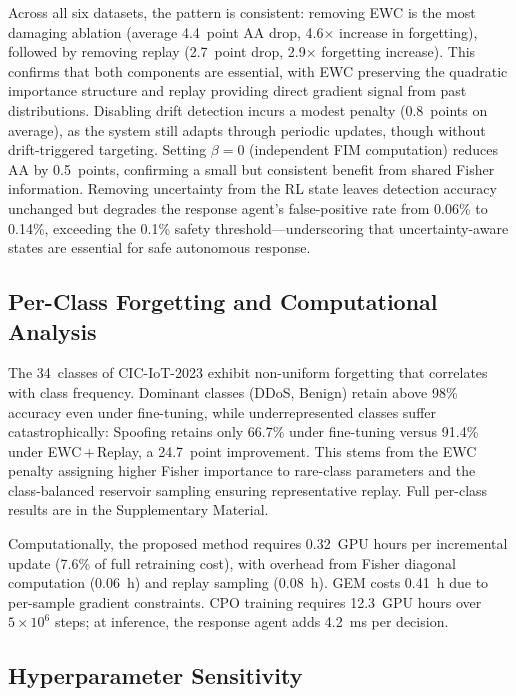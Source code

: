 \documentclass[journal]{IEEEtran}
\theoremstyle{definition}
\theoremstyle{remark}
\begin{document}
Across all six datasets, the pattern is consistent: removing EWC is the most damaging ablation (average 4.4~point AA drop, 4.6$\times$ increase in forgetting), followed by removing replay (2.7~point drop, 2.9$\times$ forgetting increase). This confirms that both components are essential, with EWC preserving the quadratic importance structure and replay providing direct gradient signal from past distributions. Disabling drift detection incurs a modest penalty (0.8~points on average), as the system still adapts through periodic updates, though without drift-triggered targeting. Setting $\beta = 0$ (independent FIM computation) reduces AA by 0.5~points, confirming a small but consistent benefit from shared Fisher information. Removing uncertainty from the RL state leaves detection accuracy unchanged but degrades the response agent's false-positive rate from 0.06\% to 0.14\%, exceeding the 0.1\% safety threshold---underscoring that uncertainty-aware states are essential for safe autonomous response.

\subsection{Per-Class Forgetting and Computational Analysis}
\label{subsec:perclass}

The 34~classes of CIC-IoT-2023 exhibit non-uniform forgetting that correlates with class frequency. Dominant classes (DDoS, Benign) retain above 98\% accuracy even under fine-tuning, while underrepresented classes suffer catastrophically: Spoofing retains only 66.7\% under fine-tuning versus 91.4\% under EWC\,+\,Replay, a 24.7~point improvement. This stems from the EWC penalty assigning higher Fisher importance to rare-class parameters and the class-balanced reservoir sampling ensuring representative replay. Full per-class results are in the Supplementary Material.

Computationally, the proposed method requires 0.32~GPU hours per incremental update (7.6\% of full retraining cost), with overhead from Fisher diagonal computation (0.06~h) and replay sampling (0.08~h). GEM costs 0.41~h due to per-sample gradient constraints. CPO training requires 12.3~GPU hours over $5\times10^6$ steps; at inference, the response agent adds 4.2~ms per decision.

\subsection{Hyperparameter Sensitivity}
\label{subsec:sensitivity}
\end{document}
